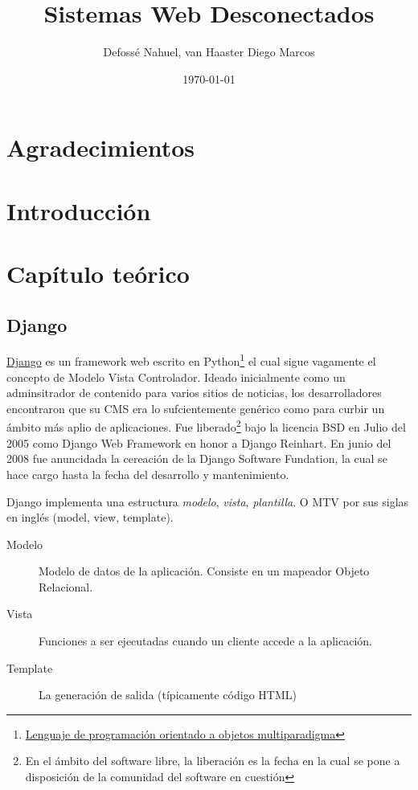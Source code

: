 \documentclass[a4paper]{report}
\begin{document}
\title{Sistemas Web Desconectados}
\author{Defossé Nahuel, van Haaster Diego Marcos}
\date{\today}

\maketitle

\tableofcontents
\listoffigures
\listoftables

\chapter*{Agradecimientos}

\begin{abstract}

\end{abstract}


\chapter{Introducción}
\label{ch:intro}

\chapter{Capítulo teórico}
\section{Django}
\href{http://www.djangoproject.com}{Django} es un framework web escrito en
Python\footnote{\href{http://www.python.org/}{Lenguaje de programación
orientado a objetos multiparadigma}} el cual sigue vagamente el concepto de Modelo Vista
Controlador. Ideado inicialmente como un adminsitrador de contenido para varios sitios de noticias, los desarrolladores encontraron que su CMS era lo sufcientemente genérico como
para curbir un ámbito más aplio de aplicaciones. Fue liberado\footnote{En el
ámbito del software libre, la liberación es la fecha en la cual se pone a
disposición de la comunidad del software en cuestión} bajo la licencia BSD en
Julio del 2005 como Django Web Framework en honor a Django Reinhart. En junio del
2008 fue anuncidada la cereación de la Django Software Fundation, la cual se hace
cargo hasta la fecha del desarrollo y mantenimiento.

Django implementa una estructura \emph{modelo}, \emph{vista}, \emph{plantilla}.
O MTV por sus siglas en inglés (model, view, template).
\begin{description}
\item[Modelo] Modelo de datos de la aplicación. Consiste en un mapeador Objeto
Relacional.
\item[Vista] Funciones a ser ejecutadas cuando un cliente accede a la
aplicación.
\item[Template] La generación de salida (típicamente código HTML)
\end{description}
\end{document}
